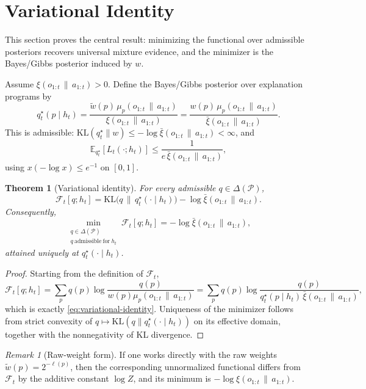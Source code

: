 \documentclass[11pt]{article}
\newtheorem{theorem}[definition]{Theorem}
\theoremstyle{remark}
\newtheorem{remark}[definition]{Remark}
\newcommand{\Pcal}{\mathcal{P}}
\newcommand{\Fcal}{\mathcal{F}}
\newcommand{\E}{\mathbb{E}}
\newcommand{\KL}{\mathrm{KL}}
\newcommand{\givena}{\,\|\,}
\newcommand{\ellp}{\ell}
\newcommand{\wt}{\widetilde}
\newcommand{\barxi}{\bar{\xi}}
\begin{document}
\section{Variational Identity}
\label{sec:variational}

This section proves the central result: minimizing the functional over admissible posteriors recovers universal mixture evidence, and the minimizer is the Bayes/Gibbs posterior induced by \(w\).

Assume \(\xi(o_{1:t} \givena a_{1:t}) > 0\). Define the Bayes/Gibbs posterior over explanation programs by
\begin{equation}
q_t^\star(p \mid h_t)
= \frac{\wt{w}(p)\,\mu_p(o_{1:t} \givena a_{1:t})}
{\xi(o_{1:t} \givena a_{1:t})}
= \frac{w(p)\,\mu_p(o_{1:t} \givena a_{1:t})}
{\barxi(o_{1:t} \givena a_{1:t})}.
\label{eq:gibbs-posterior}
\end{equation}
This is admissible: \(\KL(q_t^\star\|w)\le -\log \barxi(o_{1:t}\givena a_{1:t})<\infty\), and
\[
\E_{q_t^\star}[L_t(\cdot;h_t)]
\le \frac{1}{e\,\barxi(o_{1:t}\givena a_{1:t})},
\]
using \(x(-\log x)\le e^{-1}\) on \([0,1]\).

\begin{theorem}[Variational identity]
\label{thm:variational-identity}
For every admissible \(q \in \Delta(\Pcal)\),
\begin{equation}
\Fcal_t[q;h_t]
= \KL\!\bigl(q \,\|\, q_t^\star(\cdot \mid h_t)\bigr)
- \log \barxi(o_{1:t} \givena a_{1:t}).
\label{eq:variational-identity}
\end{equation}
Consequently,
\[
\min_{\substack{q \in \Delta(\Pcal)\\ q\ \mathrm{admissible\ for}\ h_t}} \Fcal_t[q;h_t]
= -\log \barxi(o_{1:t} \givena a_{1:t}),
\]
attained uniquely at \(q_t^\star(\cdot \mid h_t)\).
\end{theorem}

\begin{proof}
Starting from the definition of \(\Fcal_t\),
\[
\Fcal_t[q;h_t]
= \sum_p q(p)\log\frac{q(p)}{w(p)\mu_p(o_{1:t}\givena a_{1:t})}
= \sum_p q(p)\log\frac{q(p)}
{q_t^\star(p\mid h_t)\,\barxi(o_{1:t}\givena a_{1:t})},
\]
which is exactly \eqref{eq:variational-identity}. Uniqueness of the minimizer follows from strict convexity of \(q \mapsto \KL(q\|q_t^\star(\cdot\mid h_t))\) on its effective domain, together with the nonnegativity of KL divergence.
\end{proof}

\begin{remark}[Raw-weight form]
If one works directly with the raw weights \(\wt{w}(p)=2^{-\ellp(p)}\), then the corresponding unnormalized functional differs from \(\Fcal_t\) by the additive constant \(\log Z\), and its minimum is \(-\log \xi(o_{1:t}\givena a_{1:t})\).
\end{remark}
\end{document}
